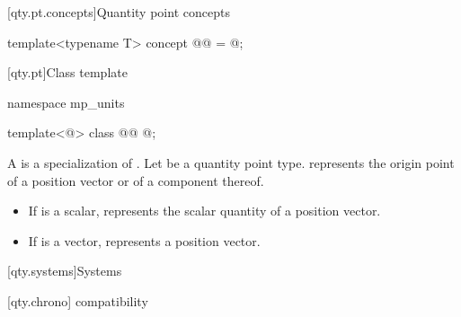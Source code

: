 [qty.pt.concepts]{Quantity point concepts}

\begin{itemdecl}
template<typename T>
concept @@ = @\unspecnc@;
\end{itemdecl}

[qty.pt]{Class template }

\begin{codeblock}
namespace mp_units {

template<@\unspec@>
class @@ { @\unspec@ };

}
\end{codeblock}

\pnum
\label{term.quantity.point.type}
A  is a specialization of .
Let  be a quantity point type.
 represents
the origin point of a position vector
or of a component thereof.
\begin{itemize}
\item
If  is a scalar,
 represents the scalar quantity
of a position vector.
\item
If  is a vector,
 represents a position vector.
\end{itemize}

[qty.systems]{Systems}

[qty.chrono]{ compatibility}

